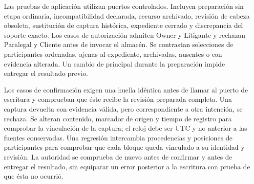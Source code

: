 Las pruebas de aplicación utilizan puertos controlados. Incluyen preparación sin etapa ordinaria, incompatibilidad declarada, recurso archivado, revisión de cabeza obsoleta, sustitución de captura histórica, expediente cerrado y discrepancia del soporte exacto. Los casos de autorización admiten Owner y Litigante y rechazan Paralegal y Cliente antes de invocar el almacén. Se contrastan selecciones de participantes ordenadas, ajenas al expediente, archivadas, ausentes o con evidencia alterada. Un cambio de principal durante la preparación impide entregar el resultado previo.

Los casos de confirmación exigen una huella idéntica antes de llamar al puerto de escritura y comprueban que éste recibe la revisión preparada completa. Una captura devuelta con evidencia válida, pero correspondiente a otra intención, se rechaza. Se alteran contenido, marcador de origen y tiempo de registro para comprobar la vinculación de la captura; el reloj debe ser UTC y no anterior a las fuentes conservadas. Una regresión intercambia procedencias y posiciones de participantes para comprobar que cada bloque queda vinculado a su identidad y revisión. La autoridad se comprueba de nuevo antes de confirmar y antes de entregar el resultado, sin equiparar un error posterior a la escritura con prueba de que ésta no ocurrió.

